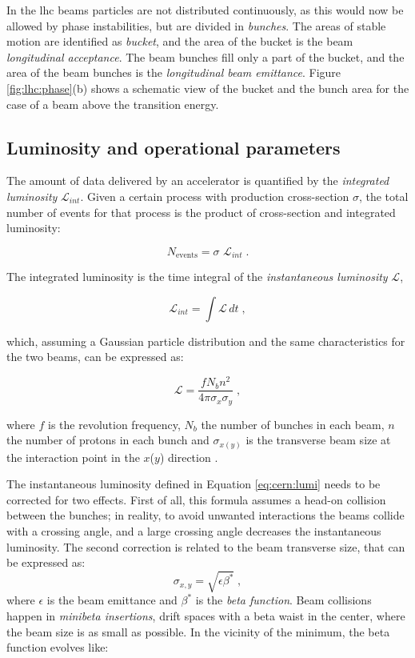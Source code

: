In the \gls{lhc} beams particles are not distributed continuously, as this would now be allowed by phase instabilities, but are divided in \textit{bunches}. 
The areas of stable motion are identified as \textit{bucket}, and the area of the bucket is the beam \textit{longitudinal acceptance}. The beam bunches fill only a part of the bucket, and the area of the beam bunches is the \textit{longitudinal beam emittance}. Figure \ref{fig:lhc:phase}(b) shows a schematic view of the bucket and the bunch area for the case of a beam above the transition energy. 

\subsection{Luminosity and operational parameters}

The amount of data delivered by an accelerator is quantified by the \textit{integrated luminosity} $\mathcal{L}_{int}$.
Given a certain process with production cross-section $\sigma$, the total number of events for that process is the product of cross-section and integrated luminosity:

\begin{equation}
\label{eq:cern:nev}
N_{\mathrm{events}} = \sigma \,\, \mathcal{L}_{int} \; .
\end{equation}

The integrated luminosity is the time integral of the \textit{instantaneous luminosity} $\mathcal{L}$, 

\begin{equation}
\label{eq:cern:intlumi}
\mathcal{L}_{int} = \int \mathcal{L} \, dt \; ,
\end{equation}

\noindent which, assuming a Gaussian particle distribution and the same characteristics for the two beams, can be expressed as:

\begin{equation}
\mathcal{L}=\frac{f N_b n^2}{4 \pi \sigma_{x}\sigma_{y} } \; ,
\label{eq:cern:lumi}
\end{equation}

\noindent where $f$ is the revolution frequency, $N_b$ the number of bunches in each beam, $n$ the number of protons in each bunch and $\sigma_{x(y)}$  is the transverse beam size at the interaction point in the $x$($y$) direction . 

The instantaneous luminosity defined in Equation \ref{eq:cern:lumi} needs to be corrected for two effects. First of all, this formula assumes a head-on collision between the bunches; in reality, to avoid unwanted interactions the beams collide with a crossing angle, and a large crossing angle decreases the instantaneous luminosity. The second correction is related to the beam transverse size, that can be expressed as:
\begin{equation}
\sigma_{x,y} = \sqrt{  \epsilon \beta^* } \; ,
\end{equation}
where $\epsilon$ is the beam emittance and $\beta^*$ is the \textit{beta function}. Beam collisions happen in \textit{minibeta insertions}, drift spaces with a beta waist in the center, where the beam size is as small as possible. In the vicinity of the minimum, the beta function evolves like:

